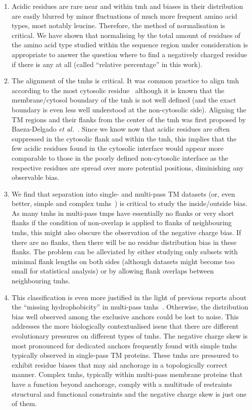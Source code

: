 \begin{enumerate}[i]
  \item Acidic residues are rare near and within \gls{tmh} and biases in their distribution are easily blurred by minor fluctuations of much more frequent amino acid types, most notably leucine. Therefore, the method of normalisation is critical. We have shown that normalising by the total amount of residues of the amino acid type studied within the sequence region under consideration is appropriate to answer the question where to find a negatively charged residue if there is any at all (called ``relative percentage'' in this work).
  \item The alignment of the \gls{tmh}s is critical. It was common practice to align \gls{tmh} according to the most cytosolic residue~\cite{Sharpe2010} although it is known that the membrane/cytosol boundary of the \gls{tmh} is not well defined (and the exact boundary is even less well understood at the non-cytosolic side). Aligning the TM regions and their flanks from the center of the \gls{tmh} was first proposed by Baeza-Delgado \textit{et al.}~\cite{Baeza-Delgado2013}. Since we know now that acidic residues are often suppressed in the cytosolic flank and within the \gls{tmh}, this implies that the few acidic residues found in the cytosolic interface would appear more comparable to those in the poorly defined non-cytosolic interface as the respective residues are spread over more potential positions, diminishing any observable bias.
  \item We find that separation into single- and multi-pass TM datasets (or, even better, simple and complex \gls{tmh}s~\cite{Wong2011, Wong2012}) is critical to study the inside/outside bias. As many \gls{tmh}s in multi-pass \gls{tmp}s have essentially no flanks or very short flanks if the condition of non-overlap is applied to flanks of neighbouring \gls{tmh}s, this might also obscure the observation of the negative charge bias. If there are no flanks, then there will be no residue distribution bias in these flanks. The problem can be alleviated by either studying only subsets with minimal flank lengths on both sides (although datasets might become too small for statistical analysis) or by allowing flank overlaps between neighbouring \gls{tmh}s.
  \item This classification is even more justified in the light of previous reports about the ``missing hydrophobicity'' in multi-pass \gls{tmh}s~\cite{Nilsson1990, Hedin2010, Hessa2007, Ojemalm2012}. Otherwise, the distribution bias well observed among the exclusive anchors could be lost to noise.  This addresses the more biologically contextualised issue that there are different evolutionary pressures on different types of \gls{tmh}s. The negative charge skew is most pronounced for dedicated anchors frequently found with simple \gls{tmh}s typically observed in single-pass TM proteins. These \gls{tmh}s are pressured to exhibit residue biases that may aid anchorage in a topologically correct manner. Complex \gls{tmh}s, typically within multi-pass membrane proteins that have a function beyond anchorage, comply with a multitude of restraints structural and functional constraints and the negative charge skew is just one of them.

\end{enumerate}
